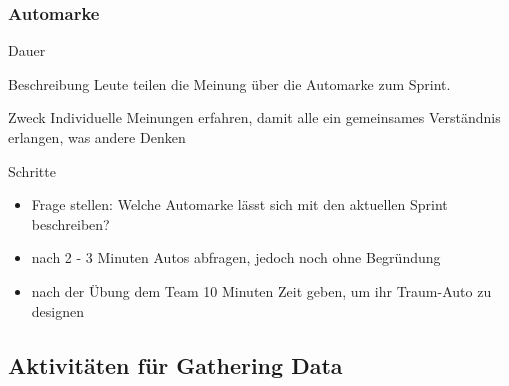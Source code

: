 \subsubsection{Automarke}
\begin{Beschreibungfett}[Beschreibung]
  \item [Dauer]
  \item [Beschreibung] Leute teilen die Meinung über die Automarke zum Sprint.
  \item [Zweck] Individuelle Meinungen erfahren, damit alle ein gemeinsames Verständnis erlangen,
    was andere Denken
  \item [Schritte]
    \begin{itemize}
      \item Frage stellen: Welche Automarke lässt sich mit den aktuellen Sprint beschreiben?
      \item nach 2 - 3 Minuten Autos abfragen, jedoch noch ohne Begründung
      \item nach der Übung dem Team 10 Minuten Zeit geben, um ihr Traum-Auto zu designen
    \end{itemize}
\end{Beschreibungfett}


\subsection{Aktivitäten für Gathering Data}


